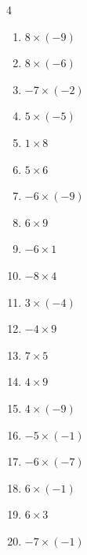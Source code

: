 \begin{multicols}{4}
\begin{enumerate}
  \item $8\times (-9)$
        \phantom{$=-72$}

  \item $8\times (-6)$
        \phantom{$=-48$}

  \item $-7\times (-2)$
        \phantom{$=14$}

  \item $5\times (-5)$
        \phantom{$=-25$}

  \item $1\times 8$
        \phantom{$=8$}

  \item $5\times 6$
        \phantom{$=30$}

  \item $-6\times (-9)$
        \phantom{$=54$}

  \item $6\times 9$
        \phantom{$=54$}

  \item $-6\times 1$
        \phantom{$=-6$}

  \item $-8\times 4$
        \phantom{$=-32$}

  \item $3\times (-4)$
        \phantom{$=-12$}

  \item $-4\times 9$
        \phantom{$=-36$}

  \item $7\times 5$
        \phantom{$=35$}

  \item $4\times 9$
        \phantom{$=36$}

  \item $4\times (-9)$
        \phantom{$=-36$}

  \item $-5\times (-1)$
        \phantom{$=5$}

  \item $-6\times (-7)$
        \phantom{$=42$}

  \item $6\times (-1)$
        \phantom{$=-6$}

\columnbreak %

  \item $6\times 3$
        \phantom{$=18$}

  \item $-7\times (-1)$
        \phantom{$=7$}


\end{enumerate}
\end{multicols}
